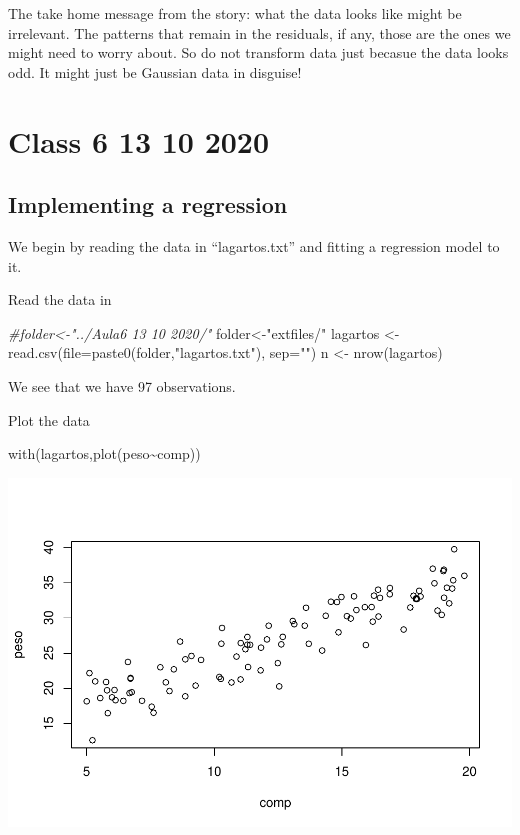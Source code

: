 \documentclass[
]{book}
\newenvironment{Shaded}{\begin{snugshade}}{\end{snugshade}}
\newcommand{\AttributeTok}[1]{\textcolor[rgb]{0.77,0.63,0.00}{#1}}
\newcommand{\CommentTok}[1]{\textcolor[rgb]{0.56,0.35,0.01}{\textit{#1}}}
\newcommand{\FunctionTok}[1]{\textcolor[rgb]{0.00,0.00,0.00}{#1}}
\newcommand{\NormalTok}[1]{#1}
\newcommand{\OtherTok}[1]{\textcolor[rgb]{0.56,0.35,0.01}{#1}}
\newcommand{\SpecialCharTok}[1]{\textcolor[rgb]{0.00,0.00,0.00}{#1}}
\newcommand{\StringTok}[1]{\textcolor[rgb]{0.31,0.60,0.02}{#1}}
\begin{document}
The take home message from the story: what the data looks like might be irrelevant. The patterns that remain in the residuals, if any, those are the ones we might need to worry about. So do not transform data just becasue the data looks odd. It might just be Gaussian data in disguise!

\hypertarget{aula6}{%
\chapter{Class 6 13 10 2020}\label{aula6}}

\hypertarget{implementing-a-regression}{%
\section{Implementing a regression}\label{implementing-a-regression}}

We begin by reading the data in ``lagartos.txt'' and fitting a regression model to it.

Read the data in

\begin{Shaded}
\begin{Highlighting}[]
\CommentTok{\#folder\textless{}{-}"../Aula6 13 10 2020/"}
\NormalTok{folder}\OtherTok{\textless{}{-}}\StringTok{"extfiles/"}
\NormalTok{lagartos }\OtherTok{\textless{}{-}} \FunctionTok{read.csv}\NormalTok{(}\AttributeTok{file=}\FunctionTok{paste0}\NormalTok{(folder,}\StringTok{"lagartos.txt"}\NormalTok{), }\AttributeTok{sep=}\StringTok{""}\NormalTok{)}
\NormalTok{n }\OtherTok{\textless{}{-}} \FunctionTok{nrow}\NormalTok{(lagartos)}
\end{Highlighting}
\end{Shaded}

We see that we have 97 observations.

Plot the data

\begin{Shaded}
\begin{Highlighting}[]
\FunctionTok{with}\NormalTok{(lagartos,}\FunctionTok{plot}\NormalTok{(peso}\SpecialCharTok{\textasciitilde{}}\NormalTok{comp))}
\end{Highlighting}
\end{Shaded}

\includegraphics{ECOMODbook_files/figure-latex/a6.2-1.pdf}
\end{document}
